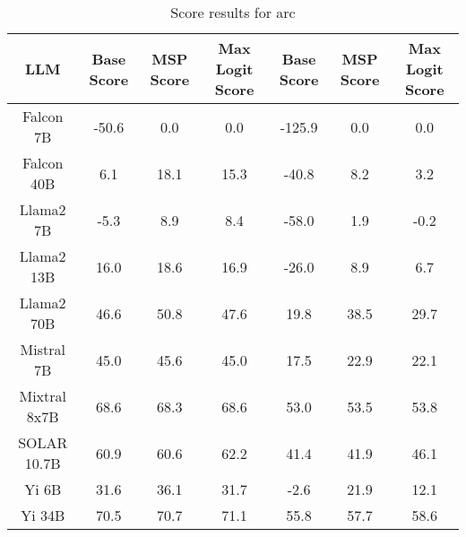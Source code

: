 \renewcommand\arraystretch{1.2}
\begin{table*}
\centering
\begin{tabular}{c|c|c|c|c|c|c}
LLM & Base Score & MSP Score & Max Logit Score & Base Score & MSP Score & Max Logit Score\\ \hline
Falcon 7B & -50.6 & 0.0 & 0.0 & -125.9 & 0.0 & 0.0\\
Falcon 40B & 6.1 & 18.1 & 15.3 & -40.8 & 8.2 & 3.2\\
Llama2 7B & -5.3 & 8.9 & 8.4 & -58.0 & 1.9 & -0.2\\
Llama2 13B & 16.0 & 18.6 & 16.9 & -26.0 & 8.9 & 6.7\\
Llama2 70B & 46.6 & 50.8 & 47.6 & 19.8 & 38.5 & 29.7\\
Mistral 7B & 45.0 & 45.6 & 45.0 & 17.5 & 22.9 & 22.1\\
Mixtral 8x7B & 68.6 & 68.3 & 68.6 & 53.0 & 53.5 & 53.8\\
SOLAR 10.7B & 60.9 & 60.6 & 62.2 & 41.4 & 41.9 & 46.1\\
Yi 6B & 31.6 & 36.1 & 31.7 & -2.6 & 21.9 & 12.1\\
Yi 34B & 70.5 & 70.7 & 71.1 & 55.8 & 57.7 & 58.6\\
\hline
\end{tabular}
\caption{Score results for arc}
\end{table*}
\label{tab:arc_score}
